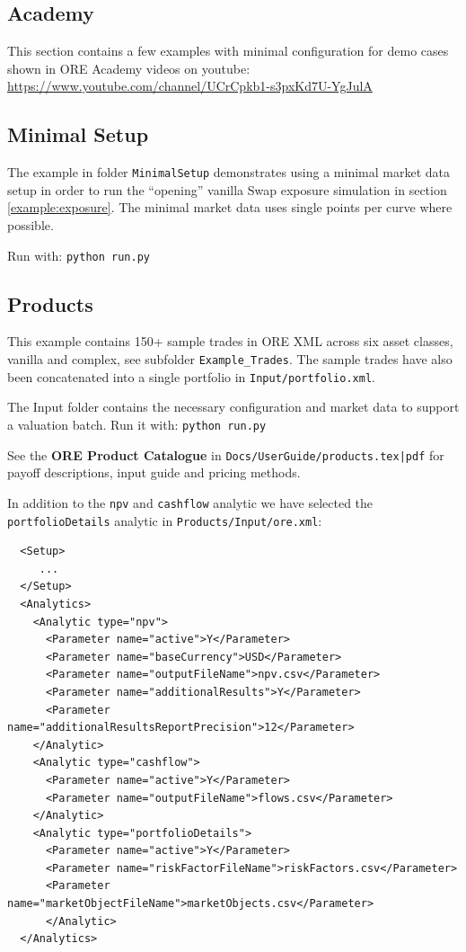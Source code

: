 \subsection{Academy}\label{example:academy}

This section contains a few examples with minimal configuration for demo cases shown in ORE Academy videos
on youtube: \url{https://www.youtube.com/channel/UCrCpkb1-s3pxKd7U-YgJulA}

\subsection{Minimal Setup}\label{example:minimal}

The example in folder {\tt MinimalSetup} demonstrates using a minimal market data setup in order to run the ``opening''
vanilla Swap exposure simulation in section \ref{example:exposure}.
The minimal market data uses single points per curve where possible.

Run with: {\tt python run.py}

\subsection{Products}

This example contains 150+ sample trades in ORE XML across six asset classes, vanilla and complex, see subfolder {\tt Example\_Trades}.
The sample trades have also been concatenated into a single portfolio in {\tt Input/portfolio.xml}.

The Input folder contains the necessary configuration and market data to support a valuation batch. Run it with: {\tt python run.py}

See the {\bf ORE Product Catalogue} in {\tt Docs/UserGuide/products.tex|pdf} for payoff descriptions, input guide and pricing methods.

\medskip
In addition to the {\tt npv} and {\tt cashflow} analytic we have selected the {\tt portfolioDetails} analytic in {\tt Products/Input/ore.xml}:

\begin{verbatim}
  <Setup>
     ...
  </Setup>
  <Analytics>
    <Analytic type="npv">
      <Parameter name="active">Y</Parameter>
      <Parameter name="baseCurrency">USD</Parameter>
      <Parameter name="outputFileName">npv.csv</Parameter>
      <Parameter name="additionalResults">Y</Parameter>
      <Parameter name="additionalResultsReportPrecision">12</Parameter>
    </Analytic>
    <Analytic type="cashflow">
      <Parameter name="active">Y</Parameter>
      <Parameter name="outputFileName">flows.csv</Parameter>
    </Analytic>
    <Analytic type="portfolioDetails">
      <Parameter name="active">Y</Parameter>
      <Parameter name="riskFactorFileName">riskFactors.csv</Parameter>
      <Parameter name="marketObjectFileName">marketObjects.csv</Parameter>
      </Analytic>
  </Analytics>
\end{verbatim}

